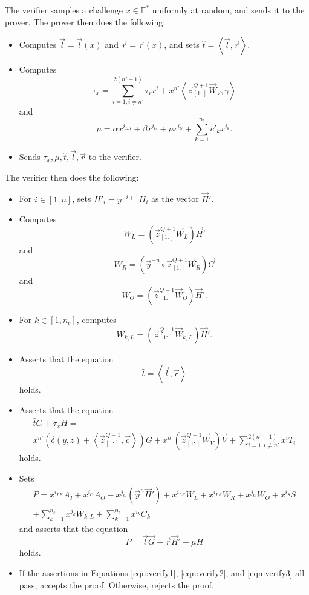 \documentclass{article}
\newcommand{\FF}{\mathbb{F}}
\newcommand{\mat}[1]{\vec{#1}}
\newcommand{\zq}{\vec{z}^{Q+1}_{[1:]}}
\begin{document}
The verifier samples a challenge $x \in \FF^*$ uniformly at random, and sends it to the prover.
The prover then does the following:
\begin{itemize}
	\item Computes $\vec{l} = \vec{l}(x)$ and $\vec{r} = \vec{r}(x)$, and sets $\widehat{t} = \left\langle \vec{l}, \vec{r} \right\rangle$.
	\item Computes
	$$\tau_x = \sum_{i=1, i \neq n'}^{2(n' + 1)} \tau_i x^i + x^{n'} \left\langle \zq \mat{W}_V, \gamma \right\rangle$$
	and
	$$\mu = \alpha x^{i_{LR}} + \beta x^{i_O} + \rho x^{i_S} + \sum_{k=1}^{n_c} c'_k x^{i_k}.$$
	\item Sends $\tau_x, \mu, \widehat{t}, \vec{l}, \vec{r}$ to the verifier.
\end{itemize}
The verifier then does the following:
\begin{itemize}
	\item For $i \in [1, n]$, sets $H'_i = y^{-i + 1} H_i$ as the vector $\vec{H}'$.
	\item Computes
	$$W_L = \left( \zq \mat{W}_L \right) \vec{H}'$$
	and
	$$W_R = \left( \vec{y}^{-n} \circ \zq \mat{W}_R \right) \vec{G}$$
	and
	$$W_O = \left( \zq \mat{W}_O \right) \vec{H}'.$$
	\item For $k \in [1, n_c]$, computes
	$$W_{k,L} = \left( \zq \mat{W}_{k,L} \right) \vec{H}'.$$
	\item Asserts that the equation
	\begin{equation}
		\label{eqn:verify1}
		\widehat{t} = \left\langle \vec{l}, \vec{r} \right\rangle
	\end{equation}
	holds.
	\item Asserts that the equation
	\begin{multline}
		\label{eqn:verify2}
		\widehat{t} G + \tau_x H = \\
		x^{n'}\left( \delta(y, z) + \left\langle \zq, \vec{c} \right\rangle \right)G + x^{n'}\left( \zq \vec{W}_V \right) \vec{V} + \sum_{i=1, i \neq n'}^{2(n' + 1)} x^i T_i
	\end{multline}
	holds.
	\item Sets
	\begin{multline*}
		P = x^{i_{LR}} A_I + x^{i_O} A_O - x^{j_O} \left( \vec{y}^n \vec{H}' \right) + x^{i_{LR}} W_L + x^{i_{LR}} W_R + x^{j_O} W_O + x^{i_S} S \\
		+ \sum_{k=1}^{n_c} x^{j_k} W_{k,L} + \sum_{k=1}^{n_c} x^{i_k} C_k
	\end{multline*}
	and asserts that the equation
	\begin{equation}
		\label{eqn:verify3}
		P = \vec{l} \vec{G} + \vec{r} \vec{H}' + \mu H
	\end{equation}
	holds.
	\item If the assertions in Equations \ref{eqn:verify1}, \ref{eqn:verify2}, and \ref{eqn:verify3} all pass, accepts the proof.
	Otherwise, rejects the proof.
\end{itemize}
\end{document}
